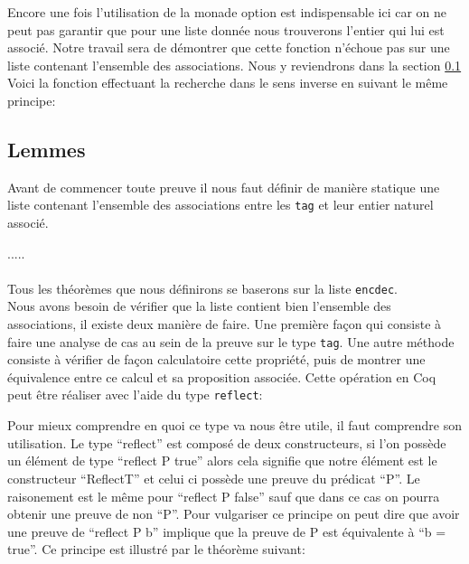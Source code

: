 \documentclass {article}
\newcommand{\codefrom}[3]
           {}
\theoremstyle{definition}
\theoremstyle{remark}
\newcommand{\fun}[1]{\lstinline!#1!}
\begin{document}
Encore une fois l'utilisation de la monade option est indispensable ici car
on ne peut pas garantir que pour une liste donnée nous trouverons l'entier
qui lui est associé. Notre travail sera de démontrer que cette fonction n'échoue pas
sur une liste contenant l'ensemble des associations. Nous y reviendrons dans la section
\ref{Lemmeslol}
Voici la fonction effectuant la recherche dans le sens inverse en suivant le même principe:

\codefrom{src}{association_list}{lookdown}



\subsection{Lemmes}
\label{Lemmeslol}

Avant de commencer toute preuve il nous faut définir de manière statique une liste
contenant l'ensemble des associations entre les \fun{tag} et leur entier naturel associé.


\codefrom{src}{association_list}{encdec}
.....\\ \\

Tous les théorèmes que nous définirons se baserons sur la liste \fun{encdec}. \\
Nous avons besoin de vérifier que la liste contient bien l'ensemble des associations,
il existe deux manière de faire. Une première façon qui consiste à faire une analyse de cas
au sein de la preuve sur le type \fun{tag}.
Une autre méthode consiste à vérifier de façon calculatoire cette propriété, puis de montrer
une équivalence entre ce calcul et sa proposition associée. 
Cette opération en Coq peut être réaliser avec l'aide du type \fun{reflect}:

\codefrom{rapport}{definitions}{reflect}

Pour mieux comprendre en quoi ce type va nous être utile, il faut comprendre son utilisation.
Le type ``reflect'' est composé de deux constructeurs, si l'on possède un élément de type
``reflect P true'' alors cela signifie que notre élément est le constructeur ``ReflectT''
et celui ci possède une preuve du prédicat ``P''. Le raisonement est le même pour ``reflect P false''
sauf que dans ce cas on pourra obtenir une preuve de non ``P''. Pour vulgariser ce
principe on peut dire que avoir une preuve de ``reflect P b'' implique que la preuve
de P est équivalente à ``b = true''. Ce principe est illustré par le théorème suivant:
\end{document}
